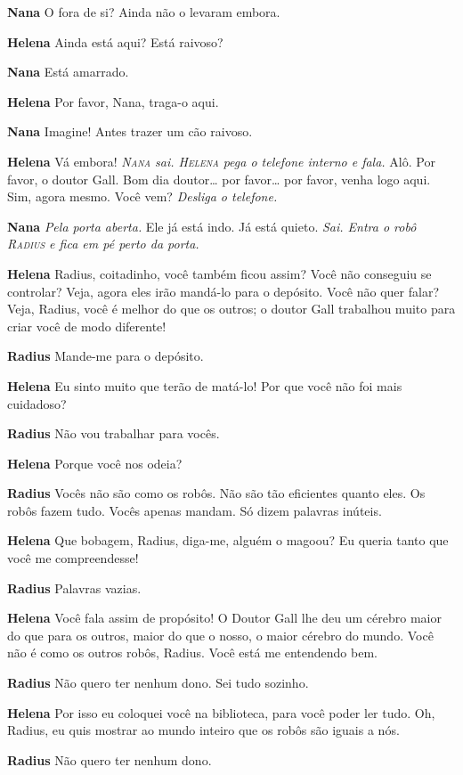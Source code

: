 \textbf{Nana} O fora de si? Ainda não o levaram embora.

\textbf{Helena} Ainda está aqui? Está raivoso?

\textbf{Nana} Está amarrado.

\textbf{Helena} Por favor, Nana, traga-o aqui.

\textbf{Nana} Imagine! Antes trazer um cão raivoso.

\textbf{Helena} Vá embora! \emph{\textsc{Nana} sai. \textsc{Helena} pega o telefone interno e fala.}
Alô. Por favor, o doutor Gall. Bom dia doutor\ldots{} por favor\ldots{} por
favor, venha logo aqui. Sim, agora mesmo. Você vem? \emph{Desliga o
telefone.}

\textbf{Nana} \emph{Pela porta aberta.} Ele já está indo. Já está quieto.
\emph{Sai. Entra o robô \textsc{Radius} e fica em pé perto da porta.}

\textbf{Helena} Radius, coitadinho, você também ficou assim? Você não conseguiu se
controlar? Veja, agora eles irão mandá-lo para o depósito. Você não quer falar?
Veja, Radius, você é melhor do que os outros; o doutor Gall trabalhou muito para
criar você de modo diferente!

\textbf{Radius} Mande-me para o depósito.

\textbf{Helena} Eu sinto muito que terão de matá-lo! Por que você não foi mais cuidadoso?

\textbf{Radius} Não vou trabalhar para vocês.

\textbf{Helena} Porque você nos odeia?

\textbf{Radius} Vocês não são como os robôs. Não são tão eficientes quanto eles. Os
robôs fazem tudo. Vocês apenas mandam. Só dizem palavras inúteis.

\textbf{Helena} Que bobagem, Radius, diga-me, alguém o magoou? Eu queria tanto que você
me compreendesse!

\textbf{Radius} Palavras vazias.

\textbf{Helena} Você fala assim de propósito! O Doutor Gall lhe deu um cérebro maior do
que para os outros, maior do que o nosso, o maior cérebro do mundo. Você não é
como os outros robôs, Radius. Você está me entendendo bem.

\textbf{Radius} Não quero ter nenhum dono. Sei tudo sozinho.

\textbf{Helena} Por isso eu coloquei você na biblioteca, para você poder ler tudo. Oh,
Radius, eu quis mostrar ao mundo inteiro que os robôs são iguais a nós.

\textbf{Radius} Não quero ter nenhum dono.

